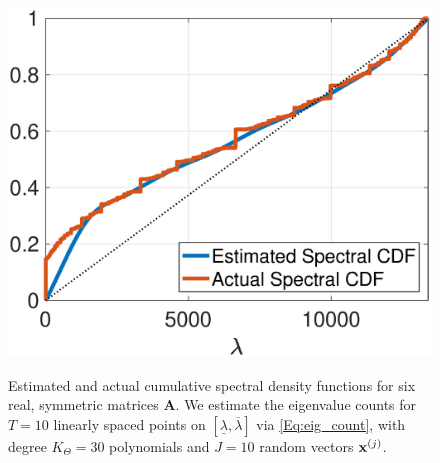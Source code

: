 \documentclass{article}
\begin{document}
\begin{figure}[bt]
\begin{minipage}[m]{0.32\linewidth}
\centerline{~~\includegraphics[width=1.1\linewidth]{fig_saylr4_cdf}}
\end{minipage}
\caption{Estimated and actual cumulative spectral density functions for six real, symmetric matrices {\bf A}. We estimate the eigenvalue counts for $T=10$ linearly spaced points on $[\underline{\lambda}, \overline{\lambda}]$ via \eqref{Eq:eig_count}, with degree $K_{\Theta}=30$ polynomials and $J=10$ random vectors ${\bf x}^{(j)}$.}\label{Fig:cdf}
\end{figure}

%
%
%
\end{document}
